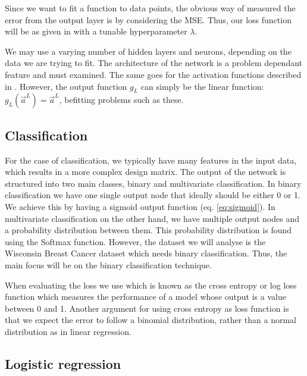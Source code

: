     Since we want to fit a function to data points, the obvious way of measured the error from the output layer is by considering the MSE. Thus, our loss function will be as given in  with a tunable hyperparameter $\lambda$. 

    We may use a varying number of hidden layers and neurons, depending on the data we are trying to fit. The architecture of the network is a problem dependant feature and must examined. The same goes for the activation functions described in . However, the output function $g_L$ can simply be the linear function: $g_L(\vec{a}^L) = \vec{a}^{L}$, befitting problems such as these.
    

\subsection{Classification}\label{sec:classification}
    For the case of classification, we typically have many features in the input data, which results in a more complex design matrix. The output of the network is structured into two main classes, binary and multivariate classification. In binary classification we have one single output node that ideally should be either 0 or 1. We achieve this by having a sigmoid output function (eq. \eqref{eq:sigmoid}). In multivariate classification on the other hand, we have multiple output nodes and a probability distribution between them. This probability distribution is found using the Softmax function. However, the dataset we will analyse is the Wisconsin Breast Cancer dataset \citep{scikit-learn} which needs binary classification. Thus, the main focus will be on the binary classification technique. 

    When evaluating the loss we use   which is known as the cross entropy or log loss function which measures the performance of a model whose output is a value between 0 and 1. Another argument for using cross entropy as loss function is that we expect the error to follow a binomial distribution, rather than a normal distribution as in linear regression.

\subsection{Logistic regression}\label{sec:logistic_regression}

